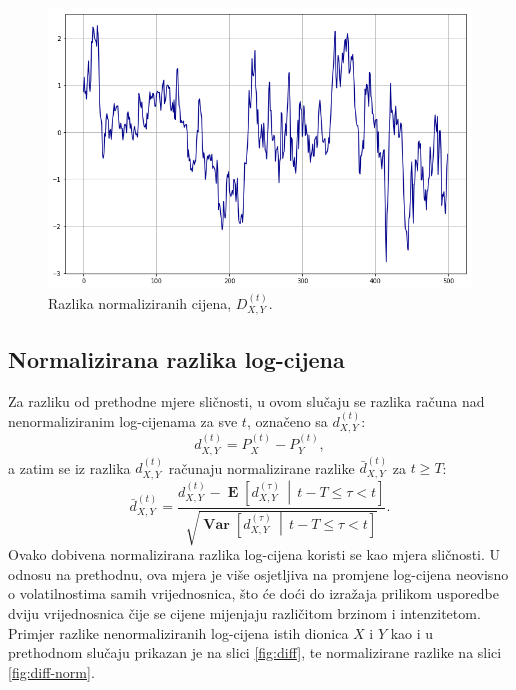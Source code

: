 \documentclass[lmodern, utf8, diplomski, numeric]{fer}
\newcommand{\Efromto}[2]{\operatorname{\mathbf{E}}\q[#1\, \middle\vert\, #2\w]}
\newcommand{\Varfromto}[2]{\operatorname{\mathbf{Var}}\q[#1\, \middle\vert\, #2\w]}
\newcommand{\norm}[1]{\bar{#1}}
\newcommand{\q}{\left}
\newcommand{\w}{\right}
\begin{document}
  \begin{figure}[p]
    \centering
    \includegraphics[width=1.0\linewidth]{graphics/ab-prices-norm-diff.png}
    \caption{
      Razlika normaliziranih cijena, $D_{X,Y}^{\q(t\w)}$.}
    \label{fig:ab-prices-norm-diff}
  \end{figure}
  
  \subsection{Normalizirana razlika log-cijena}
  Za razliku od prethodne mjere sličnosti, u ovom slučaju se razlika računa nad nenormaliziranim log-cijenama za sve $t$, označeno sa $d_{X,Y}^{\q(t\w)}$:
  \begin{equation}
  d_{X,Y}^{\q(t\w)} = P_X^{\q(t\w)} - P_Y^{\q(t\w)},
  \end{equation}
  a zatim se iz razlika $d_{X,Y}^{\q(t\w)}$ računaju normalizirane razlike $\norm{d}_{X,Y}^{\q(t\w)}$ za $t \ge T$:
  \begin{equation}
  \norm{d}_{X,Y}^{\q(t\w)} = \frac{d_{X,Y}^{\q(t\w)} - \Efromto{d_{X,Y}^{(\tau)}}{t-T \le \tau < t}}{\sqrt{\Varfromto{d_{X,Y}^{(\tau)}}{t-T \le \tau < t}}}.
  \end{equation}
  Ovako dobivena normalizirana razlika log-cijena koristi se kao mjera sličnosti.
  U odnosu na prethodnu, ova mjera je više osjetljiva na promjene log-cijena neovisno o volatilnostima samih vrijednosnica, što će doći do izražaja prilikom usporedbe dviju vrijednosnica čije se cijene mijenjaju različitom brzinom i intenzitetom.
  Primjer razlike nenormaliziranih log-cijena istih dionica $X$ i $Y$ kao i u prethodnom slučaju prikazan je na slici \ref{fig:diff}, te normalizirane razlike na slici \ref{fig:diff-norm}.
  
\end{document}
